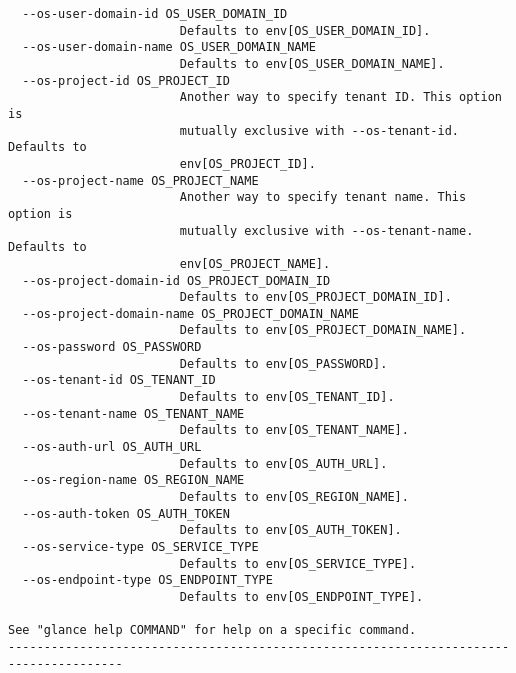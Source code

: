 \documentclass[a4paper,left=1.5cm,right=1.5cm,11pt]{article}
\begin{document}
\begin{lstlisting}
  --os-user-domain-id OS_USER_DOMAIN_ID
                        Defaults to env[OS_USER_DOMAIN_ID].
  --os-user-domain-name OS_USER_DOMAIN_NAME
                        Defaults to env[OS_USER_DOMAIN_NAME].
  --os-project-id OS_PROJECT_ID
                        Another way to specify tenant ID. This option is
                        mutually exclusive with --os-tenant-id. Defaults to
                        env[OS_PROJECT_ID].
  --os-project-name OS_PROJECT_NAME
                        Another way to specify tenant name. This option is
                        mutually exclusive with --os-tenant-name. Defaults to
                        env[OS_PROJECT_NAME].
  --os-project-domain-id OS_PROJECT_DOMAIN_ID
                        Defaults to env[OS_PROJECT_DOMAIN_ID].
  --os-project-domain-name OS_PROJECT_DOMAIN_NAME
                        Defaults to env[OS_PROJECT_DOMAIN_NAME].
  --os-password OS_PASSWORD
                        Defaults to env[OS_PASSWORD].
  --os-tenant-id OS_TENANT_ID
                        Defaults to env[OS_TENANT_ID].
  --os-tenant-name OS_TENANT_NAME
                        Defaults to env[OS_TENANT_NAME].
  --os-auth-url OS_AUTH_URL
                        Defaults to env[OS_AUTH_URL].
  --os-region-name OS_REGION_NAME
                        Defaults to env[OS_REGION_NAME].
  --os-auth-token OS_AUTH_TOKEN
                        Defaults to env[OS_AUTH_TOKEN].
  --os-service-type OS_SERVICE_TYPE
                        Defaults to env[OS_SERVICE_TYPE].
  --os-endpoint-type OS_ENDPOINT_TYPE
                        Defaults to env[OS_ENDPOINT_TYPE].

See "glance help COMMAND" for help on a specific command.
--------------------------------------------------------------------------------------
\end{lstlisting}
\end{document}

